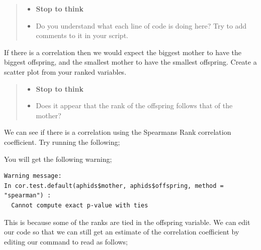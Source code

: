 \documentclass[
]{book}
\newenvironment{Shaded}{\begin{snugshade}}{\end{snugshade}}
\newcommand{\AttributeTok}[1]{\textcolor[rgb]{0.13,0.29,0.53}{#1}}
\newcommand{\ConstantTok}[1]{\textcolor[rgb]{0.56,0.35,0.01}{#1}}
\newcommand{\FunctionTok}[1]{\textcolor[rgb]{0.13,0.29,0.53}{\textbf{#1}}}
\newcommand{\NormalTok}[1]{#1}
\newcommand{\SpecialCharTok}[1]{\textcolor[rgb]{0.81,0.36,0.00}{\textbf{#1}}}
\newcommand{\StringTok}[1]{\textcolor[rgb]{0.31,0.60,0.02}{#1}}
\providecommand{\tightlist}{%
  \setlength{\itemsep}{0pt}\setlength{\parskip}{0pt}}
\begin{document}
\begin{quote}
\begin{itemize}
\tightlist
\item
  \textbf{Stop to think}
\item
  Do you understand what each line of code is doing here? Try to add comments to it in your script.
\end{itemize}
\end{quote}

If there is a correlation then we would expect the biggest mother to have the biggest offspring, and the smallest mother to have the smallest offspring. Create a scatter plot from your ranked variables.

\begin{quote}
\begin{itemize}
\tightlist
\item
  \textbf{Stop to think}
\item
  Does it appear that the rank of the offspring follows that of the mother?
\end{itemize}
\end{quote}

We can see if there is a correlation using the Spearmans Rank correlation coefficient. Try running the following;

\begin{Shaded}
\end{Shaded}

You will get the following warning;

\begin{verbatim}
Warning message:
In cor.test.default(aphids$mother, aphids$offspring, method = "spearman") :
  Cannot compute exact p-value with ties
\end{verbatim}

This is because some of the ranks are tied in the offspring variable. We can edit our code so that we can still get an estimate of the correlation coefficient by editing our command to read as follows;

\begin{Shaded}
\end{Shaded}
\end{document}
